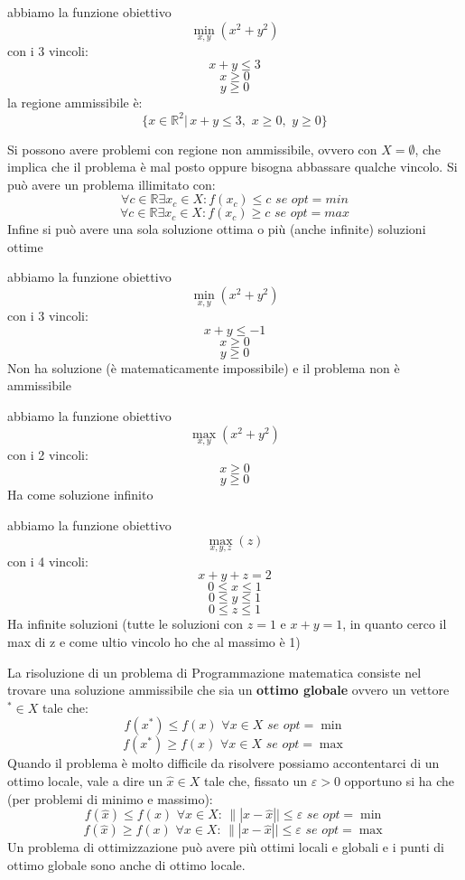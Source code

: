 \documentclass[a4paper,12pt, oneside]{book}
\begin{document}
\begin{esempio}
  abbiamo la funzione obiettivo
  \[\min_{x,y}(x^2+y^2)\]
  con i 3 vincoli:
  \[x+y \leq 3\]
  \[x\geq 0\]
  \[y\geq 0\]
  la regione ammissibile è:
  \[\{x\in\mathbb{R}^2|\,x+y \leq 3,\,\,x\geq 0,\,\,y\geq 0\}\]
\end{esempio}
Si possono avere problemi con regione non ammissibile, ovvero con
$X=\emptyset$, che implica che il problema è mal posto oppure bisogna
abbassare qualche vincolo. Si può avere un problema illimitato con:
\[\forall c \in \mathbb{R}\exists x_c\in X:f(x_c)\leq c\,\, se\,\,
  opt = min\]
\[\forall c \in \mathbb{R}\exists x_c\in X:f(x_c)\geq c\,\, se\,\,
  opt = max\]
Infine si può avere una sola soluzione ottima o più (anche infinite)
soluzioni ottime
\begin{esempio}
  abbiamo la funzione obiettivo
  \[\min_{x,y}(x^2+y^2)\]
  con i 3 vincoli:
  \[x+y \leq -1\]
  \[x\geq 0\]
  \[y\geq 0\]
  Non ha soluzione (è matematicamente impossibile) e il problema
  non è ammissibile
\end{esempio}
\begin{esempio}
  abbiamo la funzione obiettivo
  \[\max_{x,y}(x^2+y^2)\]
  con i 2 vincoli:
  \[x\geq 0\]
  \[y\geq 0\]
  Ha come soluzione infinito
\end{esempio}
\begin{esempio}
  abbiamo la funzione obiettivo
  \[\max_{x,y,z}(z)\]
  con i 4 vincoli:
  \[x+y+z = 2\]
  \[0\leq x \leq 1\]
  \[0\leq y \leq 1\]
  \[0\leq z \leq 1\]
  Ha infinite soluzioni (tutte le soluzioni con $z=1$ e $x+y=1$, in quanto cerco
  il max di z e come ultio vincolo ho che al massimo è 1)
\end{esempio}
La risoluzione di un problema di Programmazione matematica consiste
nel trovare una soluzione ammissibile che sia un \textbf{ottimo
  globale} ovvero un vettore $^*\in X$ tale che:
\[f(x^*)\leq f(x)\,\,\forall x\in X\,\,se\,\,opt=\min\]
\[f(x^*)\geq f(x)\,\,\forall x\in X\,\,se\,\,opt=\max\]
Quando il problema è molto difficile da risolvere possiamo
accontentarci di un ottimo locale, vale a dire un $\hat{x}\in X$ tale
che, fissato un $\varepsilon > 0$ opportuno si ha che (per problemi di
minimo e massimo):
\[f(\hat{x})\leq f(x)\,\,\forall x\in X:\,\||x-\hat{x}||\leq
  \varepsilon\,\,se\,\,opt=\min\]
\[f(\hat{x})\geq f(x)\,\,\forall x\in X:\,\||x-\hat{x}||\leq \varepsilon\,\,se\,\,opt=\max\]
Un problema di ottimizzazione può avere più ottimi locali e globali e
i punti di ottimo globale sono anche di ottimo locale.
\end{document}
